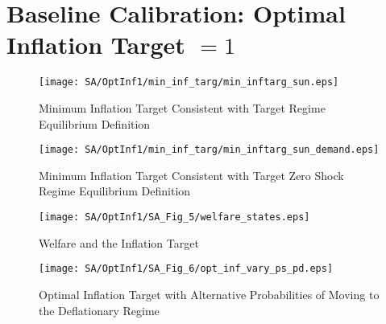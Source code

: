 \documentclass[11pt]{article}
\begin{document}
\newpage
\section{Baseline Calibration: Optimal Inflation Target $=1$}
\begin{figure}[!htb]
	\begin{center}
		\caption{Minimum Inflation Target Consistent with Target Regime Equilibrium Definition}
		\texttt{[image: SA/OptInf1/min\_inf\_targ/min\_inftarg\_sun.eps]}\\
	\end{center}
\end{figure}
\begin{figure}[!htb]
	\begin{center}
		\caption{Minimum Inflation Target Consistent with Target Zero Shock Regime Equilibrium Definition}
		\texttt{[image: SA/OptInf1/min\_inf\_targ/min\_inftarg\_sun\_demand.eps]}\\
	\end{center}
\end{figure}
\begin{figure}[!htb]
	\begin{center}
		\caption{Welfare and the Inflation Target}
		\texttt{[image: SA/OptInf1/SA\_Fig\_5/welfare\_states.eps]}\\
	\end{center}
\end{figure}
\begin{figure}[!htb]
	\begin{center}
		\caption{Optimal Inflation Target with Alternative Probabilities of Moving to the Deflationary Regime}
		\texttt{[image: SA/OptInf1/SA\_Fig\_6/opt\_inf\_vary\_ps\_pd.eps]}\\
	\end{center}
\end{figure}

\newpage
\end{document}

